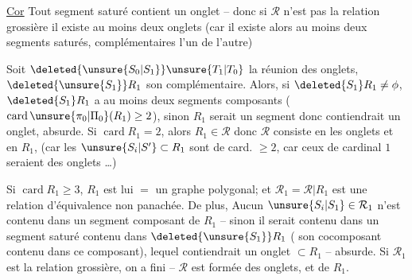 \uline{Cor} Tout  segment saturé contient un onglet -- donc si $\mathcal{R}$ n'est pas la relation grossière il existe au moins deux onglets (car il existe alors au moins deux segments saturés, complémentaires l'un de l'autre)

Soit  $\deleted{\unsure{S_{0}|S_1}}\unsure{T_{1}|T_{0}}$ la réunion des onglets, $\deleted{\unsure{S_1}}R_1$ son complémentaire. Alors, si $\deleted{S_1}R_1\ne\phi$, $\deleted{S_1}R_1$ a au moins deux segments composants ($\operatorname{card}\unsure{\pi_0|\Pi_0}(R_1)\geq 2$), sinon $R_1$ serait un segment donc contiendrait un onglet, absurde. Si $\operatorname{card} R_1=2$, alors $R_1\in\mathcal{R}$  donc $\mathcal{R}$ consiste en les onglets et en $R_1$, (car  les $\unsure{S_i|S'}\subset R_1$ sont de card. $\geq 2$,  car ceux de cardinal $1$ seraient des onglets \ldots)

Si $\operatorname{card} R_1\geq 3$, $R_1$ est lui $=$ un graphe polygonal; et $\mathcal{R}_1=\mathcal{R}\vert R_1$ est une relation d'équivalence non panachée. De plus, Aucun $\unsure{S_i|S_1}\in\mathcal{R}_1$ n'est contenu dans un segment composant de $R_1$ -- sinon il serait contenu dans un segment saturé contenu dans $\deleted{\unsure{S_1}}R_1$ ( son cocomposant contenu dans ce composant), lequel contiendrait un onglet $\subset R_1$ -- absurde. Si $\mathcal{R}_1$ est la relation grossière, on a fini -- $\mathcal{R}$ est formée des onglets, et de $R_1$.

